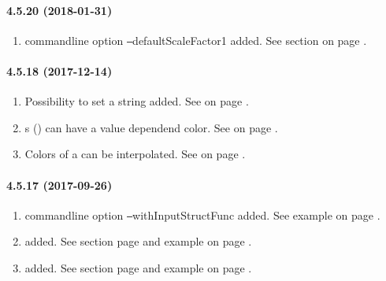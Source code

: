 \paragraph{4.5.20 (2018-01-31)}
\begin{enumerate}
\item \INTENS{} commandline option \texttt{--}defaultScaleFactor1 added.
      See section  on page \pageref{sec:scale}.

\end{enumerate}
\paragraph{4.5.18 (2017-12-14)}
\begin{enumerate}
\item Possibility to set a \STYLESHEET{} string added.
  See  on page \pageref{dia:guimorestatement}.

\item \MARKER{}s (\PLOTTWOD) can have a value dependend color.
  See  on page \pageref{dia:uiplot2dyitemoption}.

\item Colors of a \COLORSCALE{} \THERMO{} can be interpolated.
  See  on page \pageref{dia:uithermooption}.

\end{enumerate}
\paragraph{4.5.17 (2017-09-26)}
\begin{enumerate}
\item \INTENS{} commandline option \texttt{--}withInputStructFunc added.
      See example  on page \pageref{fuexample3}.

\item \NODE{} added.
      See section  page \pageref{fuexpressionsfunctions}
      and example  on page \pageref{fuexample3}.

\item \BASE{} added.
      See section  page \pageref{fu:data:reference}
      and example  on page \pageref{fuexample3}.

\end{enumerate}
